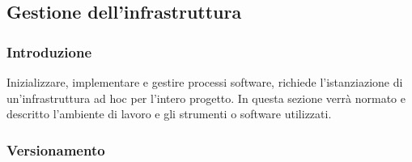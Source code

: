 \subsection{Gestione dell'infrastruttura}

\subsubsection{Introduzione}
Inizializzare, implementare e gestire processi software, richiede l’istanziazione di un’infrastruttura ad hoc per l'intero progetto. In questa sezione verrà normato e descritto l'ambiente di lavoro e gli strumenti o software utilizzati.

\subsubsection{Versionamento}

